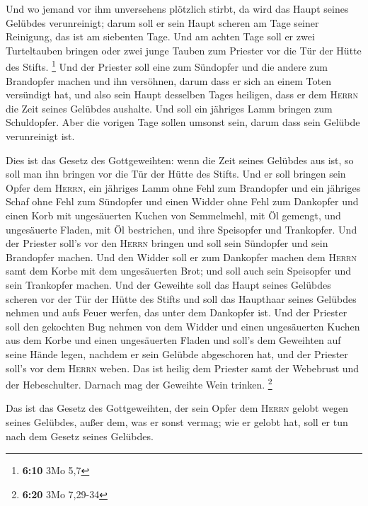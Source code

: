  Und wo jemand vor ihm unversehens plötzlich stirbt, da
wird das Haupt seines Gelübdes verunreinigt; darum soll er sein Haupt
scheren am Tage seiner Reinigung, das ist am siebenten Tage.
 Und am achten Tage soll er zwei Turteltauben bringen
oder zwei junge Tauben zum Priester vor die Tür der Hütte des Stifts.
\footnote{\textbf{6:10} 3Mo 5,7}  Und der Priester soll
eine zum Sündopfer und die andere zum Brandopfer machen und ihn
versöhnen, darum dass er sich an einem Toten versündigt hat, und also
sein Haupt desselben Tages heiligen,  dass er dem
\textsc{Herrn} die Zeit seines Gelübdes aushalte. Und soll ein jähriges
Lamm bringen zum Schuldopfer. Aber die vorigen Tage sollen umsonst sein,
darum dass sein Gelübde verunreinigt ist.

 Dies ist das Gesetz des Gottgeweihten: wenn die Zeit
seines Gelübdes aus ist, so soll man ihn bringen vor die Tür der Hütte
des Stifts.  Und er soll bringen sein Opfer dem
\textsc{Herrn}, ein jähriges Lamm ohne Fehl zum Brandopfer und ein
jähriges Schaf ohne Fehl zum Sündopfer und einen Widder ohne Fehl zum
Dankopfer  und einen Korb mit ungesäuerten Kuchen von
Semmelmehl, mit Öl gemengt, und ungesäuerte Fladen, mit Öl bestrichen,
und ihre Speisopfer und Trankopfer.  Und der Priester
soll's vor den \textsc{Herrn} bringen und soll sein Sündopfer und sein
Brandopfer machen.  Und den Widder soll er zum Dankopfer
machen dem \textsc{Herrn} samt dem Korbe mit dem ungesäuerten Brot; und
soll auch sein Speisopfer und sein Trankopfer machen. 
Und der Geweihte soll das Haupt seines Gelübdes scheren vor der Tür der
Hütte des Stifts und soll das Haupthaar seines Gelübdes nehmen und aufs
Feuer werfen, das unter dem Dankopfer ist.  Und der
Priester soll den gekochten Bug nehmen von dem Widder und einen
ungesäuerten Kuchen aus dem Korbe und einen ungesäuerten Fladen und
soll's dem Geweihten auf seine Hände legen, nachdem er sein Gelübde
abgeschoren hat,  und der Priester soll's vor dem
\textsc{Herrn} weben. Das ist heilig dem Priester samt der Webebrust und
der Hebeschulter. Darnach mag der Geweihte Wein trinken. \footnote{\textbf{6:20}
  3Mo 7,29-34}

 Das ist das Gesetz des Gottgeweihten, der sein Opfer dem
\textsc{Herrn} gelobt wegen seines Gelübdes, außer dem, was er sonst
vermag; wie er gelobt hat, soll er tun nach dem Gesetz seines Gelübdes.

